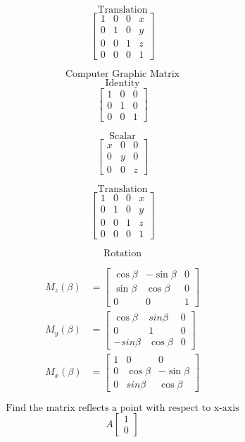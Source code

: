 \documentclass{book}
\begin{document}
\[ \text{Translation} \]
\[
        \begin{bmatrix}
            1 & 0 & 0 & x\\
            0 & 1 & 0 & y\\   
            0 & 0 & 1 & z\\  
            0 & 0 & 0 & 1  
        \end{bmatrix}
\]

\newpage
\[\text{Computer Graphic Matrix} \]
\[\text{Identity}\]
\[
        \begin{bmatrix}
            1 & 0 & 0\\
            0 & 1 & 0\\   
            0 & 0 & 1  
        \end{bmatrix}
\]

\[ \text{Scalar} \]
\[
        \begin{bmatrix}
            x & 0 & 0\\
            0 & y & 0\\   
            0 & 0 & z  
        \end{bmatrix}
\]

\[ \text{Translation} \]
\[
        \begin{bmatrix}
            1 & 0 & 0 & x\\
            0 & 1 & 0 & y\\   
            0 & 0 & 1 & z\\  
            0 & 0 & 0 & 1  
        \end{bmatrix}
\]

\[ \text{Rotation} \]

\begin{equation}
\begin{aligned}
    M_{z}(\beta) & =\begin{bmatrix}
            \cos\beta & -\sin\beta & 0\\
            \sin\beta & \cos\beta & 0\\   
            0      &   0    & 1  
        \end{bmatrix} \\
    M_{y}(\beta) & =\begin{bmatrix}
            \cos \beta & sin\beta & 0\\
            0      &   1    & 0    \\  
            -sin\beta & \cos\beta & 0   
        \end{bmatrix} \\
    M_{x}(\beta) & =\begin{bmatrix}
            1 &   0      &     0   \\         
            0 & \cos\beta & -\sin\beta\\
            0 & sin\beta& \cos\beta   
        \end{bmatrix} 
\end{aligned}
\end{equation}

\[ \text{Find the matrix reflects a point with respect to x-axis} \]
\[
        A \left[ 
        \begin{array}{c}
        1\\
        0    
        \end{array}
        \right]
\]
\end{document}
